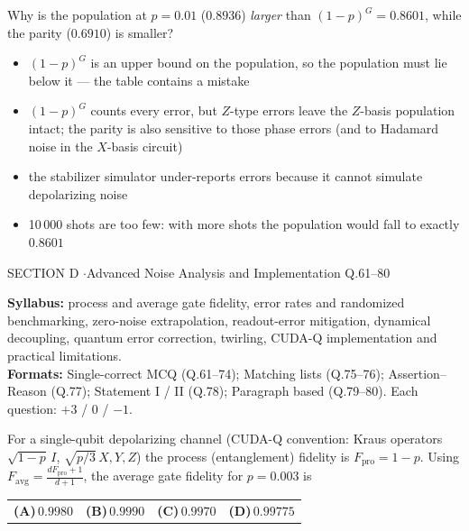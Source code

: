\documentclass[11pt,a4paper]{article}
\newcommand{\optlabel}[1]{\textbf{(#1)}}
\newenvironment{qitem}[1]{\begin{list}{}{\setlength{\leftmargin}{3.3em}\setlength{\labelwidth}{3.1em}%
  \setlength{\labelsep}{0.2em}\setlength{\topsep}{3pt}\setlength{\parsep}{3pt}}\item[\textbf{Q.#1}\hfill]}{\end{list}}
\newcommand{\qsep}{\par\vspace{2pt}{\color{black!15}\hrule}\vspace{4pt}}
\begin{document}
\begin{qitem}{60}
Why is the population at $p = 0.01$ ($0.8936$) \emph{larger} than $(1 - p)^G = 0.8601$, while the parity ($0.6910$) is smaller?
\begin{itemize}[leftmargin=2.6em, labelsep=0.4em, itemsep=2pt, topsep=3pt]
\item[\optlabel{A}] $(1-p)^G$ is an upper bound on the population, so the population must lie below it --- the table contains a mistake
\item[\optlabel{B}] $(1-p)^G$ counts every error, but $Z$-type errors leave the $Z$-basis population intact; the parity is also sensitive to those phase errors (and to Hadamard noise in the $X$-basis circuit)
\item[\optlabel{C}] the stabilizer simulator under-reports errors because it cannot simulate depolarizing noise
\item[\optlabel{D}] 10\,000 shots are too few: with more shots the population would fall to exactly $0.8601$
\end{itemize}
\end{qitem}
\qsep

\newpage

\begin{sectionbanner}SECTION D \enspace$\cdot$\enspace Advanced Noise Analysis and Implementation \hfill Q.61--80\end{sectionbanner}

{\small \textbf{Syllabus:} process and average gate fidelity, error rates and randomized benchmarking, zero-noise extrapolation, readout-error mitigation, dynamical decoupling, quantum error correction, twirling, CUDA-Q implementation and practical limitations.\\ \textbf{Formats:} Single-correct MCQ (Q.61--74); Matching lists (Q.75--76); Assertion--Reason (Q.77); Statement I / II (Q.78); Paragraph based (Q.79--80). Each question: $+3$ / $0$ / $-1$.}
\par\medskip

\begin{qitem}{61}
For a single-qubit depolarizing channel (CUDA-Q convention: Kraus operators $\sqrt{1-p}\,I$, $\sqrt{p/3}\,X, Y, Z$) the process (entanglement) fidelity is
$F_{\text{pro}} = 1 - p$. Using $F_{\text{avg}} = \frac{dF_{\text{pro}} + 1}{d + 1}$, the average gate fidelity for $p = 0.003$ is
\par\smallskip\noindent\begin{tabularx}{\linewidth}{@{}*{4}{L}@{}}
\optlabel{A}\,$0.9980$ & \optlabel{B}\,$0.9990$ & \optlabel{C}\,$0.9970$ & \optlabel{D}\,$0.99775$
\end{tabularx}
\end{qitem}
\qsep
\end{document}
